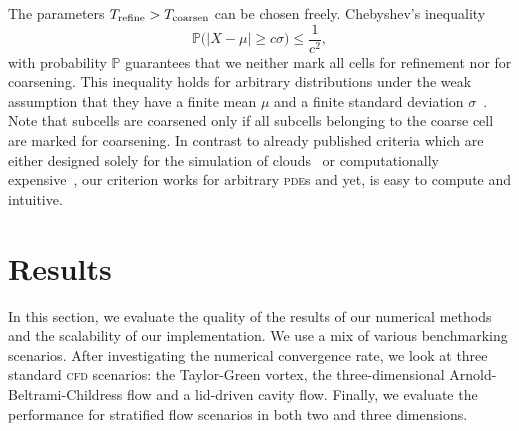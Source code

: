 \documentclass[runningheads]{llncs}
\newcommand{\pde}{\textsc{pde}}
\begin{document}
The parameters $T_\text{refine} > T_\text{coarsen}$ can be chosen freely.
Chebyshev's inequality
\begin{equation}
  \label{eq:chebychev}
  \mathbb{P}\bigl(\vert X - \mu \vert \geq c \sigma \bigr) \leq \frac{1}{c^2},
\end{equation}
with probability $\mathbb{P}$ guarantees that we neither mark all cells for refinement nor for coarsening.
This inequality holds for arbitrary distributions under the weak assumption that they have a finite mean $\mu$ and a finite standard deviation $\sigma$~\cite{wasserman2004all}.
Note that subcells are coarsened only if all subcells belonging to the coarse cell are marked for coarsening.
In contrast to already published criteria which are either designed solely for the simulation of clouds~\cite{muller2010adaptive} or computationally expensive~\cite{fambri2017space}, our criterion works for arbitrary \pde{}s and yet, is easy to compute and intuitive.

\section{Results}\label{sec:results}
In this section, we evaluate the quality of the results of our numerical methods and the scalability of our implementation.
We use a mix of various benchmarking scenarios.
After investigating the numerical convergence rate, we look at three standard \textsc{cfd} scenarios: the Taylor-Green vortex, the three-dimensional Arnold-Beltrami-Childress flow and a lid-driven cavity flow.
Finally, we evaluate the performance for stratified flow scenarios in both two and three dimensions.
\end{document}
